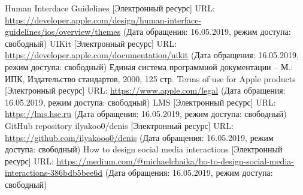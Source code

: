 \documentclass[a4paper,12pt]{article}
\begin{document}
						\newpage
	\begin{thebibliography}{6}
		 Human Interdace Guidelines [Электронный ресурс] URL: \url{https://developer.apple.com/design/human-interface-guidelines/ios/overview/themes} (Дата обращения: 16.05.2019, режим доступа: свободный)
		 UIKit [Электронный ресурс] URL: \url{https://developer.apple.com/documentation/uikit} (Дата обращения: 16.05.2019, режим доступа: свободный)
		Единая система программной документации – М.: ИПК, Издательство стандартов, 2000, 125 стр.
		 Terms of use for Apple products [Электронный ресурс] URL: \url{https://www.apple.com/legal} (Дата обращения: 16.05.2019, режим доступа: свободный)
		LMS [Электронный ресурс] URL: 
		\url{https://lms.hse.ru} (Дата обращения: 16.05.2019, режим доступа: свободный)
		 GitHub repository ilyakoo0/denis [Электронный ресурс] URL: \url{https://github.com/ilyakooo0/denis} (Дата обращения: 16.05.2019, режим доступа: свободный)
		How to design social media interactions 
		[Электронный ресурс] URL:
		\url{https://medium.com/@michaelchaika/ho-to-design-social-media-interactions-386bdb5bee6d} (Дата обращения: 16.05.2019, режим доступа: свободный)
	\end{thebibliography}
\end{document}
